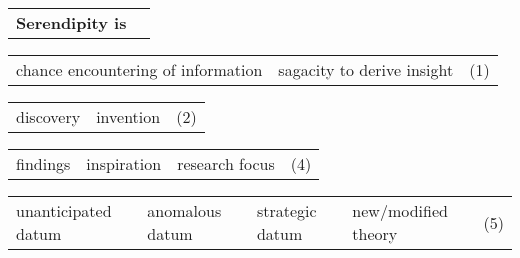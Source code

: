 \def\tabularxcolumn#1{m{#1}}
\begin{table}
{\centering\small{}
\begin{tabularx}{.98\textwidth}{Yc}  
\textbf{Serendipity is \raisebox{-.5ex}{$\cdots$}} & \phantom{(0)}\\[.5cm]
\end{tabularx}\offinterlineskip

\vspace{.2cm}
\noindent\begin{tabularx}{.98\textwidth}{Y@{\textbullet}Yc}  %
{chance encountering of information} & {sagacity to derive insight} & (1) \\
\end{tabularx}\offinterlineskip

\noindent\begin{tabularx}{.98\textwidth}{Y@{\textbullet}Yc}  %
 discovery &  invention & (2) \\
\end{tabularx}\offinterlineskip


\noindent\begin{tabularx}{.98\textwidth}{Y@{\textbullet}Y@{\textbullet}Yc} 
findings & inspiration & research focus & (4) \\
\end{tabularx}\offinterlineskip

\noindent\begin{tabularx}{.98\textwidth}{Y@{\textbullet}Y@{\textbullet}Y@{\textbullet}Yc} 
unanticipated datum & anomalous datum & {strategic datum} & {new\slash modified theory} & (5) \\
\end{tabularx}\offinterlineskip


}
\end{table}
